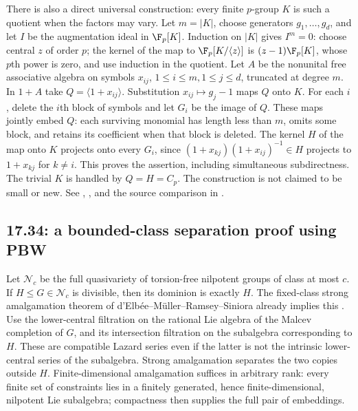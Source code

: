 There is also a direct universal construction: every finite
\(p\)-group \(K\) is such a quotient when the factors may vary.
Let \(m=|K|\), choose generators \(g_1,\ldots,g_d\), and let
\(I\) be the augmentation ideal in \(\F_p[K]\).
Induction on \(|K|\) gives \(I^m=0\): choose central \(z\) of
order \(p\); the kernel of the map to
\(\F_p[K/\langle z\rangle]\) is \((z-1)\F_p[K]\), whose
\(p\)th power is zero, and use induction in the quotient.
Let \(A\) be the nonunital free associative algebra on symbols
\(x_{ij}\), \(1\le i\le m,1\le j\le d\), truncated at degree
\(m\). In \(1+A\) take \(Q=\langle1+x_{ij}\rangle\).
Substitution \(x_{ij}\mapsto g_j-1\) maps \(Q\) onto \(K\).
For each \(i\), delete the \(i\)th block of symbols and let
\(G_i\) be the image of \(Q\). These maps jointly embed \(Q\):
each surviving monomial has length less than \(m\), omits some
block, and retains its coefficient when that block is deleted.
The kernel \(H\) of the map onto \(K\) projects onto every
\(G_i\), since
\((1+x_{kj})(1+x_{ij})^{-1}\in H\) projects to \(1+x_{kj}\)
for \(k\ne i\).
This proves the assertion, including simultaneous subdirectness.
The trivial \(K\) is handled by \(Q=H=C_p\).
The construction is not claimed to be small or new.
See ,
, and the source comparison
in .

\subsection{17.34: a bounded-class separation proof using PBW}
\label{prior:17.34}

Let \(\mathcal N_c\) be the full quasivariety of torsion-free
nilpotent groups of class at most \(c\). If \(H\le G\in\mathcal N_c\)
is divisible, then its dominion is exactly \(H\).
The fixed-class strong amalgamation theorem of
d'Elb\'ee--M\"uller--Ramsey--Siniora already implies this
\cite[Theorem~4.35]{delbee-amalgamation}.
Use the lower-central filtration on the rational Lie algebra
of the Malcev completion of \(G\), and its intersection
filtration on the subalgebra corresponding to \(H\).
These are compatible Lazard series even if the latter is
not the intrinsic lower-central series of the subalgebra.
Strong amalgamation separates the two copies outside \(H\).
Finite-dimensional amalgamation suffices in arbitrary rank:
every finite set of constraints lies in a finitely generated,
hence finite-dimensional, nilpotent Lie subalgebra; compactness
then supplies the full pair of embeddings.

